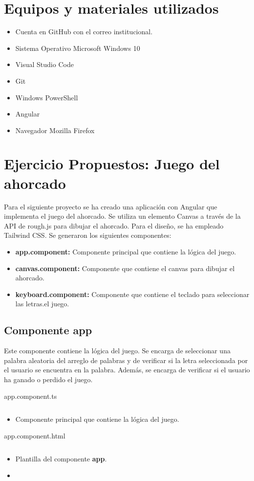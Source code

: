 \documentclass{article}
\newenvironment{block}{\captionsetup{type=listing}}{}
\begin{document}
\section{Equipos y materiales utilizados}
\begin{itemize}
	\item Cuenta en GitHub con el correo institucional.
	\item Sistema Operativo Microsoft Windows 10
	\item Visual Studio Code
	\item Git
	\item Windows PowerShell
	\item Angular
	\item Navegador Mozilla Firefox
\end{itemize}
\pagebreak

\section{Ejercicio Propuestos: Juego del ahorcado}
Para el siguiente proyecto se ha creado una aplicación con Angular que implementa el juego del ahorcado. Se utiliza un elemento Canvas a través de la API de rough.js para dibujar el ahorcado. Para el diseño, se ha empleado Tailwind CSS. Se generaron los siguientes componentes:
\begin{itemize}
	\item \textbf{app.component:} Componente principal que contiene la lógica del juego.
	\item \textbf{canvas.component:} Componente que contiene el canvas para dibujar el ahorcado.
	\item \textbf{keyboard.component:} Componente que contiene el teclado para seleccionar las letras.el juego.
\end{itemize}

\subsection{Componente app}
Este componente contiene la lógica del juego. Se encarga de seleccionar una palabra aleatoria del arreglo de palabras y de verificar si la letra seleccionada por el usuario se encuentra en la palabra. Además, se encarga de verificar si el usuario ha ganado o perdido el juego.
\begin{block}
\caption{app.component.ts}
\inputminted{TypeScript}{../hangMan/src/app/app.component.ts}
\begin{itemize}
	\item Componente principal que contiene la lógica del juego.
\end{itemize}

\caption{app.component.html}
\inputminted{HTML}{../hangMan/src/app/app.component.html}
\begin{itemize}
	\item Plantilla del componente \textbf{app}.
	\item
\end{itemize}

\end{block}
\pagebreak
\end{document}
